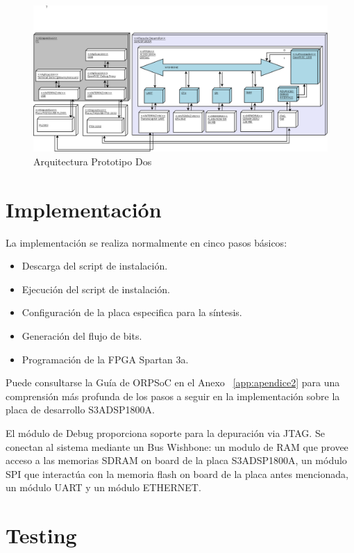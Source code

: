 		\begin{figure}[!h]
 		\begin{center}
  		\includegraphics[width=1\textwidth,keepaspectratio=true]{./images/ORPSoCdia}
  		\caption{Arquitectura Prototipo Dos}
  		\label{fig:orpsoc} 
 		\end{center}
		\end{figure}
	
		\section{Implementación}

		La implementación se realiza normalmente en cinco pasos básicos: 
		\begin {itemize}
		\item Descarga del script de instalación.
		\item Ejecución del script de instalación.
		\item Configuración de la placa especifica para la síntesis.
		\item Generación del flujo de bits.
		\item Programación de la FPGA Spartan 3a.
 		\end {itemize}
 
 	Puede consultarse la Guía de ORPSoC en el Anexo ~\ref{app:apendice2} para una comprensión más profunda de los pasos a seguir en la implementación
 	sobre la placa de desarrollo S3ADSP1800A.

	El módulo de Debug proporciona soporte para la depuración via JTAG. Se conectan al sistema mediante un Bus Wishbone: un modulo de RAM que provee
	acceso a las memorias SDRAM on board de la placa S3ADSP1800A, un módulo SPI que interactúa con la memoria flash on board de la placa antes
	mencionada, un módulo UART y un módulo ETHERNET.
		

		\section{Testing}
		
